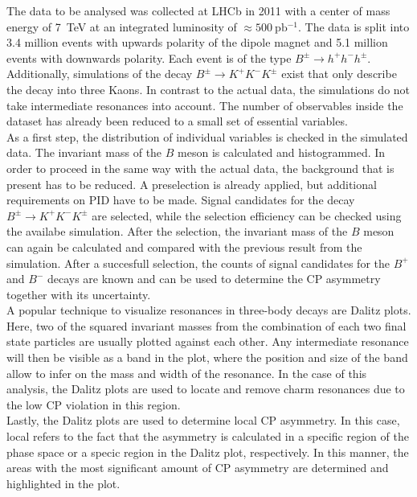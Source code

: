 The data to be analysed was collected at LHCb in 2011 with a center of mass energy of \qty{7}{\tera\electronvolt} at an integrated luminosity of $\approx \qty{500}{\pico\barn^{-1}}$.
The data is split into 3.4 million events with upwards polarity of the dipole magnet and 5.1 million events with downwards polarity. Each event is of the type
$B^\pm \rightarrow h^+ h^- h^\pm$. Additionally, simulations of the decay $B^\pm \rightarrow K^+ K^- K^\pm$ exist that only describe the decay into three Kaons.
In contrast to the actual data, the simulations do not take intermediate resonances into account. The number of observables inside the dataset has already been reduced
to a small set of essential variables. \\
As a first step, the distribution of individual variables is checked in the simulated data. The invariant mass of the $B$ meson is calculated and histogrammed.
In order to proceed in the same way with the actual data, the background that is present has to be reduced. A preselection is already applied, but additional requirements on PID have to be made.
Signal candidates for the decay $B^\pm \rightarrow K^+ K^- K^\pm$ are selected, while the selection efficiency can be checked using the availabe simulation.
After the selection, the invariant mass of the $B$ meson can again be calculated and compared with the previous result from the simulation.
After a succesfull selection, the counts of signal candidates for the $B^+$ and $B^-$ decays are known and can be used to determine the CP asymmetry together with its uncertainty. \\
A popular technique to visualize resonances in three-body decays are Dalitz plots. Here, two of the squared invariant masses from the combination of each two final state particles
are usually plotted against each other. Any intermediate resonance will then be visible as a band in the plot, where the position and size of the band allow to infer on
the mass and width of the resonance. In the case of this analysis, the Dalitz plots are used to locate and remove charm resonances due to the low CP violation in this region.\\
Lastly, the Dalitz plots are used to determine local CP asymmetry. In this case, local refers to the fact that the asymmetry is calculated in a specific region of the phase space
or a specic region in the Dalitz plot, respectively. In this manner, the areas with the most significant amount of CP asymmetry are determined and highlighted in the plot.




